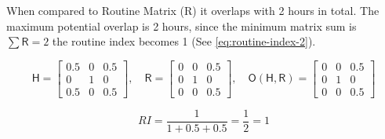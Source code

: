 When compared to Routine Matrix (R) it overlaps with 2 hours in total. The maximum potential overlap is 2 hours, since the minimum matrix sum is $\sum \mathsf{R} = 2$ the routine index becomes 1 (See \ref{eq:routine-index-2}).

\begin{equation}
\label{eq:routine-example-2}
    \mathsf{H} = 
    \begin{bmatrix}
    0.5 & 0 & 0.5\\
    0   & 1 & 0 \\
    0.5 & 0 & 0.5
    \end{bmatrix},\quad
    \mathsf{R} = 
    \begin{bmatrix}
    0 & 0 & 0.5\\
    0 & 1 & 0\\
    0 & 0 & 0.5
    \end{bmatrix},\quad
    \mathsf{O}(\mathsf{H}, \mathsf{R}) = 
    \begin{bmatrix}
    0 & 0 & 0.5\\
    0 & 1 & 0\\
    0 & 0 & 0.5
    \end{bmatrix}
\end{equation}

\begin{equation}
    \label{eq:routine-index-2}
    RI = \frac{1}{1 + 0.5 + 0.5} = \frac{1}{2} = 1
\end{equation}

